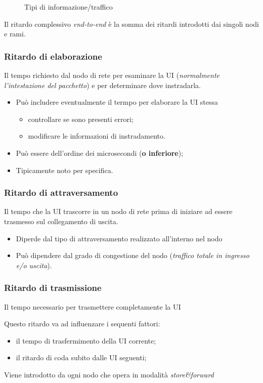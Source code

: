 \begin{figure}[ht]
  \centering
  \resizebox{5in}{!}{}
  \caption{Tipi di informazione/traffico}
  \label{fig:traffic}
\end{figure}
Il ritardo complessivo \textit{end-to-end} è la somma dei ritardi introdotti dai singoli nodi e rami.

\subsubsection{Ritardo di elaborazione}
\label{sec:ritelabo}
\begin{defi}
  Il tempo richiesto dal nodo di rete per esaminare la UI ({\it normalmente l'intestazione del pacchetto})
  e per determinare dove instradarla. 
\end{defi}
\begin{itemize}
\item Può includere eventualmente il termpo per elaborare la UI stessa
  \begin{itemize}
  \item controllare se sono presenti errori;
  \item modificare le informazioni di instradamento.
  \end{itemize}
\item Può essere dell'ordine dei microsecondi (\textbf{o inferiore});
\item Tipicamente noto per specifica. 
\end{itemize}

\subsubsection{Ritardo di attraversamento}
\label{sec:ritattra}

\begin{defi}
  Il tempo che la UI trascorre in un nodo di rete prima di iniziare ad essere trasmesso sul collegamento di
  uscita.
\end{defi}
\begin{itemize}
\item Diperde dal tipo di attraversamento realizzato all'interno nel nodo
\item Può dipendere dal grado di congestione del nodo (\textit{traffico totale in ingresso e/o uscita}).
\end{itemize}

\subsubsection{Ritardo di trasmissione}
\label{sec:rittrasm}

\begin{defi}
  Il tempo necessario per trasmettere completamente la UI
\end{defi}
Questo ritardo va ad influenzare i sequenti fattori:
\begin{itemize}
\item il tempo di trasfermimento della UI corrente;
\item il ritardo di coda subito dalle UI seguenti; 
\end{itemize}
Viene introdotto da ogni nodo che opera in modalità \textit{store\&forward}
